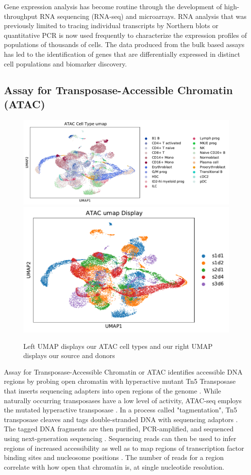 Gene expression analysis has become routine through the development of high-throughput RNA sequencing (RNA-seq) and microarrays. 
RNA analysis that was previously limited to tracing individual transcripts by Northern blots or quantitative PCR is now used frequently to characterize the expression profiles of populations of thousands of cells. 
The data produced from the bulk based assays has led to the identification of genes that are differentially expressed in distinct cell populations and biomarker discovery.

\subsection{Assay for Transposase-Accessible Chromatin (ATAC)}

\begin{figure}[H]
\centering
\includegraphics[width=.5\textwidth]{figures/umap_ATAC_ct.pdf}
\includegraphics[width=.35\textwidth]{figures/umap_ATAC.pdf}
\caption{Left UMAP displays our ATAC cell types and our right UMAP displays our source and donors}
\end{figure}

Assay for Transposase-Accessible Chromatin or ATAC identifies accessible DNA regions by probing open chromatin with hyperactive mutant Tn5 Transposase that inserts sequencing adapters into open regions of the genome \cite{six}. 
While naturally occurring transposases have a low level of activity, ATAC-seq employs the mutated hyperactive transposase \cite{seven}. 
In a process called "tagmentation", Tn5 transposase cleaves and tags double-stranded DNA with sequencing adaptors \cite{eight}. 
The tagged DNA fragments are then purified, PCR-amplified, and sequenced using next-generation sequencing \cite{eight}.
Sequencing reads can then be used to infer regions of increased accessibility as well as to map regions of transcription factor binding sites and nucleosome positions \cite{six}. 
The number of reads for a region correlate with how open that chromatin is, at single nucleotide resolution.


